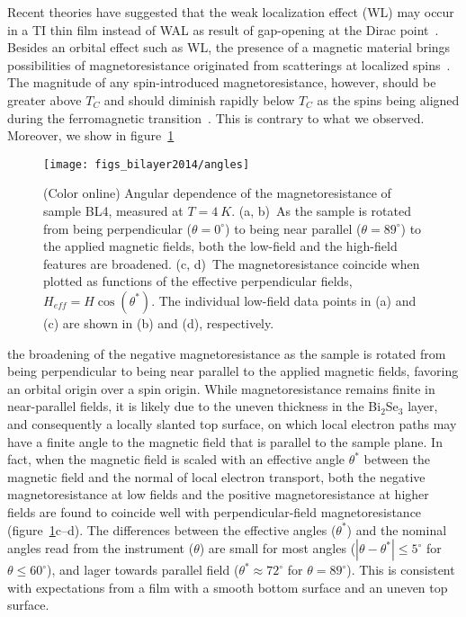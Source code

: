 Recent theories have suggested that the weak localization effect (WL) may occur in a TI thin film instead of WAL as result of gap-opening at the Dirac point~\cite{WL_WAL_competition, WL_Glazman, WL_bulk_Lu}. Besides an orbital effect such as WL, the presence of a magnetic material brings possibilities of magnetoresistance originated from scatterings at localized spins~\cite{KondoMR}. The magnitude of any spin-introduced magnetoresistance, however, should be greater above $T_C$ and should diminish rapidly below $T_C$ as the spins being aligned during the ferromagnetic transition~\cite{SpinMagnetic}. This is contrary to what we observed. Moreover, we show in figure~\ref{fig:bl2014_angular}%
%
\begin{figure}[ht]%
    \centering%
    \texttt{[image: figs\_bilayer2014/angles]}%
    \caption[Angular dependence of the magnetoresistance of a Bi$_2$Se$_3$--EuS bilayer]{\label{fig:bl2014_angular}(Color online) Angular dependence of the magnetoresistance of sample BL4, measured at $T = \SI{4}{K}$. (a, b)~As the sample is rotated from being perpendicular ($\theta = 0^\circ$) to being near parallel ($\theta = 89^\circ$) to the applied magnetic fields, both the low-field and the high-field features are broadened. (c, d)~The magnetoresistance coincide when plotted as functions of the effective perpendicular fields, $H_{eff} = H\cos(\theta^*)$. The individual low-field data points in (a) and (c) are shown in (b) and (d), respectively.}%
\end{figure} %
%
the broadening of the negative magnetoresistance as the sample is rotated from being perpendicular to being near parallel to the applied magnetic fields, favoring an orbital origin over a spin origin. While magnetoresistance remains finite in near-parallel fields, it is likely due to the uneven thickness in the Bi$_2$Se$_3$ layer, and consequently a locally slanted top surface, on which local electron paths may have a finite angle to the magnetic field that is parallel to the sample plane. In fact, when the magnetic field is scaled with an effective angle $\theta^*$ between the magnetic field and the normal of local electron transport, both the negative magnetoresistance at low fields and the positive magnetoresistance at higher fields are found to coincide well with perpendicular-field magnetoresistance (figure~\ref{fig:bl2014_angular}c--d). The differences between the effective angles ($\theta^*$) and the nominal angles read from the instrument ($\theta$) are small for most angles ($|\theta-\theta^*|\leq{}5^\circ$ for $\theta\leq{}60^\circ$), and lager towards parallel field ($\theta^*\approx{}72^\circ$ for $\theta=89^\circ$). This is consistent with expectations from a film with a smooth bottom surface and an uneven top surface.

